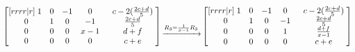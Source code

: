 \documentclass[a4paper]{article}
\begin{document}
\begin{enumerate}[label=\textbf{\arabic*.}]
\begin{enumerate}
				$$
				\begin{bmatrix}[rrrr|r]
					\hspace{1mm} 1 & 0 & -1 & 0 \hspace{1mm} & \hspace{1mm} c - 2(\frac{2c + d}{5}) \hspace{1mm}\\
					\hspace{1mm} 0 & 1 & 0 & -1 \hspace{1mm} & \hspace{1mm} \frac{2c + d}{5} \hspace{1mm}\\
					\hspace{1mm} 0 & 0 & 0 & x-1 \hspace{1mm} & \hspace{1mm} d + f \hspace{1mm}\\
					\hspace{1mm} 0 & 0 & 0 & 0 \hspace{1mm} & \hspace{1mm} c + e \hspace{1mm}\\
				\end{bmatrix}
				\begin{matrix}
					~\\
					~\\
					\xrightarrow{R_3 = \frac{1}{x-1}R_3}\\
					~\\
				\end{matrix}
				\begin{bmatrix}[rrrr|r]
					\hspace{1mm} 1 & 0 & -1 & 0 \hspace{1mm} & \hspace{1mm} c - 2(\frac{2c + d}{5}) \hspace{1mm}\\
					\hspace{1mm} 0 & 1 & 0 & -1 \hspace{1mm} & \hspace{1mm} \frac{2c + d}{5} \hspace{1mm}\\
					\hspace{1mm} 0 & 0 & 0 & 1 \hspace{1mm} & \hspace{1mm} \frac{d + f}{x-1} \hspace{1mm}\\
					\hspace{1mm} 0 & 0 & 0 & 0 \hspace{1mm} & \hspace{1mm} c + e \hspace{1mm}\\
				\end{bmatrix}
				$$


\end{enumerate}
\end{enumerate}
\end{document}

